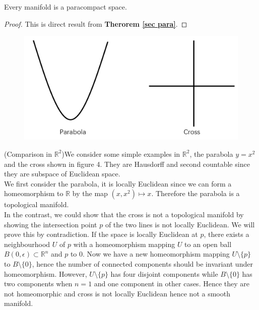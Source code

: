 \documentclass[12pt,twoside]{article}
\begin{document}
\begin{corollary}
Every manifold is a paracompact space.
\begin{proof}
This is direct result from \textbf{Therorem \ref{sec para}}.
\end{proof}
\end{corollary}
\begin{figure}
\centering
\includegraphics[width=120mm]{Parabola and Cross.png} 
\caption{ \label{overflow}}
\end{figure}
\begin{example}{(Comparison in $\mathbb{R}^2$)}We consider some simple examples in $\mathbb{R}^2$, the parabola $y=x^{2}$ and the cross shown in figure 4. They are Hausdorff and second countable since they are subspace of Euclidean space.\\
We first consider the parabola, it is locally Euclidean since we can form a homeomorphism to $\mathbb{R}$ by the map $(x,x^{2})\mapsto x$. Therefore the parabola is a topological manifold. \\
In the contrast, we could show that the cross is not a topological manifold by showing the intersection point $p$ of the two lines is not locally Euclidean. We will prove this by contradiction. If the space is locally Euclidean at $p$, there exists a neighbourhood $U$ of $p$ with a homeomorphism mapping $U$ to an open ball $B(0,\epsilon)\subset \mathbb{R}^n$ and $p$ to $0$. Now we have a new homeomorphism mapping $U\setminus \{p\}$ to $B\setminus \{0\}$, hence the number of connected components should be invariant under homeomorphism. However, $U\setminus \{p\}$ has four disjoint components while $B\setminus \{0\}$ has two components when $n=1$ and one component in other cases. Hence they are not homeomorphic and cross is not locally Euclidean hence not a smooth manifold.
\end{example}
\end{document}
